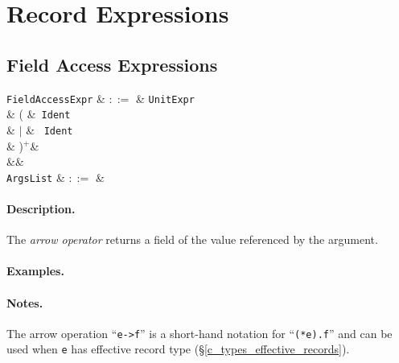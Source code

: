 \section{Record Expressions}
\label{c_expr_record}


\subsection{Field Access Expressions}
\label{c_expr_field_access}

\begin{syntax}
  \verb+FieldAccessExpr+ & $::=$ & \verb+UnitExpr+\\
   &  \big( &\ \verb+Ident+\ \\
   & $|$ & \token{->}\ \verb+Ident+\ \\
   & \big)$^+$&\\
&&\\
\verb+ArgsList+ & $::=$ & \\
\end{syntax}

\paragraph{Description.}

The {\em arrow operator} returns a field of the value referenced by the argument.

\paragraph{Examples.}

\paragraph{Notes.} The arrow operation ``\lstinline{e->f}'' is a short-hand notation for ``\lstinline{(*e).f}'' and can be used when \lstinline{e} has effective record type (\S\ref{c_types_effective_records}).




